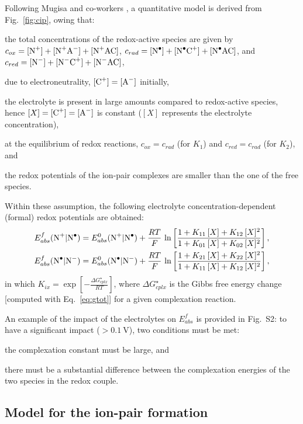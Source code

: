 \documentclass[review,preprint]{elsarticle}
\begin{document}
Following Mugisa and co-workers \cite{mugisaEffectIonparingKinetics2024}, a quantitative model is derived from Fig.~\ref{fig:cip}, owing that: \begin{inparaenum}[(i)]
	\item the total concentrations of the redox-active species are given by $c_{ox} = [\ce{N+}] + [\ce{N+A-}] + [\ce{N+AC}]$, $c_{rad} = [\ce{N^.}] + [\ce{N^.C+}] + [\ce{N^.AC}]$, and $c_{red} =  [\ce{N-}] + [\ce{N^-C+}] + [\ce{N^-AC}]$,
	\item due to electroneutrality, $ [\ce{C+}] = [\ce{A-}]$ initially,
	\item the electrolyte is present in large amounts compared to redox-active species, hence $[X] = [\ce{C+}] = [\ce{A-}] $ is constant ($[X]$ represents the electrolyte concentration),
	\item at the equilibrium of redox reactions, $c_{ox} = c_{rad}$ (for $K_1$) and $c_{red} = c_{rad}$ (for $K_2$), and
	\item the redox potentials of the ion-pair complexes are smaller than the one of the free species.
\end{inparaenum}
Within these assumption, the following electrolyte concentration-dependent (formal) redox potentials are obtained:\begin{align}
	E^f_{abs}(\ce{N+|N^.}) &= E^0_ {abs}(\ce{N+|N^.})+\frac{RT}{F}\,\ln\left[\frac{1+K_{11}\,[X]+K_{12}\,[X]^2}{1+K_{01}\,[X]+K_{02}\,[X]^2}\right],\label{eq:ef1}\\
	E^f_{abs}(\ce{N^.|N-}) &= E^0_ {abs}(\ce{N^.|N-})+\frac{RT}{F}\,\ln\left[\frac{1+K_{21}\,[X]+K_{22}\,[X]^2}{1+K_{11}\,[X]+K_{12}\,[X]^2}\right],\label{eq:ef2}
\end{align}
in which $K_{ix}= \exp\left[-\frac{\Delta G_{cplx}^\star}{RT}\right]$, where $\Delta G_{cplx}^\star$ is the Gibbs free energy change [computed with Eq.~\eqref{eq:gtot}] for a given complexation reaction.

An example of the impact of the electrolytes on $E^f_{abs}$ is provided in Fig.~S2: to have a significant impact ($>\SI{0.1}{\volt}$), two conditions must be met: \begin{inparaenum}[(i)]
	\item the complexation constant must be large, and
	\item there must be a substantial difference between the complexation energies of the two species in the redox couple.
\end{inparaenum}

\subsection{Model for the ion-pair formation}
\end{document}

